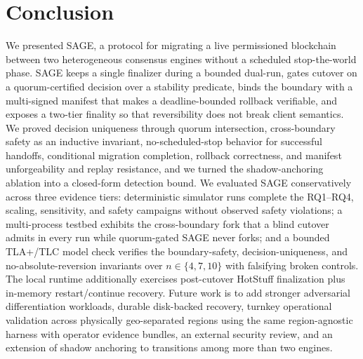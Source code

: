 \documentclass[journal]{IEEEtran}
\theoremstyle{definition}
\theoremstyle{remark}
\begin{document}
\section{Conclusion}
\label{sec:conclusion}
We presented SAGE, a protocol for migrating a live permissioned blockchain between two
heterogeneous consensus engines without a scheduled stop-the-world phase. SAGE keeps a single finalizer
during a bounded dual-run, gates cutover on a quorum-certified decision over a stability
predicate, binds the boundary with a multi-signed manifest that makes a deadline-bounded
rollback verifiable, and exposes a two-tier finality so that reversibility does not break client
semantics. We proved decision uniqueness through quorum intersection, cross-boundary safety as an
inductive invariant, no-scheduled-stop behavior for successful handoffs, conditional migration completion,
rollback correctness, and manifest unforgeability and replay resistance, and we turned the
shadow-anchoring ablation into a closed-form detection bound. We evaluated SAGE
conservatively across three evidence tiers: deterministic simulator runs
complete the RQ1--RQ4, scaling, sensitivity, and safety campaigns without observed
safety violations; a multi-process testbed exhibits the cross-boundary fork that a blind cutover
admits in every run while quorum-gated SAGE never forks; and a bounded TLA+/TLC model check
verifies the boundary-safety, decision-uniqueness, and no-absolute-reversion invariants over
$n\in\{4,7,10\}$ with falsifying broken controls. The local runtime additionally exercises
post-cutover HotStuff finalization plus in-memory restart/continue recovery. Future work is to
add stronger adversarial differentiation workloads, durable disk-backed recovery, turnkey
operational validation across physically geo-separated regions using the same region-agnostic
harness with operator evidence bundles, an external security review, and an
extension of shadow anchoring to transitions among more than two engines.

\appendices
\end{document}
